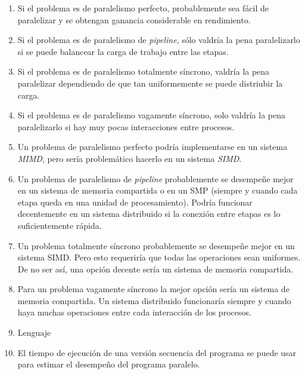 \begin{enumerate}

    \item Si el problema es de paralelismo perfecto, probablemente sea fácil de
    paralelizar y se obtengan ganancia considerable en rendimiento.

    \item Si el problema es de paralelismo de \textit{pipeline}, sólo valdría
    la pena paralelizarlo si se puede balancear la carga de trabajo entre las
    etapas.

    \item Si el problema es de paralelismo totalmente síncrono, valdría la pena
    paralelizar dependiendo de que tan uniformemente se puede distriubir la
    carga.

    \item Si el problema es de paralelismo vagamente síncrono, solo valdría la
    pena paralelizarlo si hay muy pocas interacciones entre procesos.

    \item Un problema de paralelismo perfecto podría implementarse en un sistema
    \textit{MIMD}, pero sería problemático hacerlo en un sistema \textit{SIMD}.
    
    \item Un problema de paralelismo de \textit{pipeline} probablemente se
    desempeñe mejor en un sistema de memoria compartida o en un SMP (siempre y
    cuando cada etapa queda en una unidad de procesamiento). Podría funcionar
    decentemente en un sistema distribuido si la conexión entre etapas es lo
    suficientemente rápida.
    
    \item Un problema totalmente síncrono probablemente se desempeñe mejor en un
    sistema SIMD. Pero esto requeriría que todas las operaciones sean uniformes.
    De no ser así, una opción decente sería un sistema de memoria compartida.
    
    \item Para un problema vagamente síncrono la mejor opción sería un sistema
    de memoria compartida. Un sistema distribuido funcionaría siempre y cuando
    haya muchas operaciones entre cada interacción de los procesos.
    
    \item Lenguaje
    
    \item El tiempo de ejecución de una versión secuencia del programa se puede
    usar para estimar el desempeño del programa paralelo.
    

\end{enumerate}
